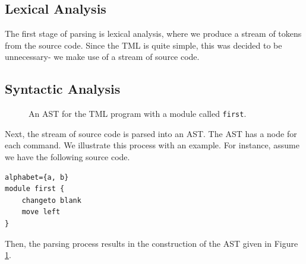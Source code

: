 \subsection{Lexical Analysis}
The first stage of parsing is lexical analysis, where we produce a stream of tokens from the source code. Since the TML is quite simple, this was decided to be unnecessary- we make use of a stream of source code.

\subsection{Syntactic Analysis}

\begin{figure}[htb]
    \centering
    \caption{An AST for the TML program with a module called \texttt{first}.}
    \label{fig:TML_AST}
\end{figure}

Next, the stream of source code is parsed into an AST. The AST has a node for each command. 
We illustrate this process with an example. For instance, assume we have the following source code.
\begin{lstlisting}[language=TML]
alphabet={a, b}
module first {
    changeto blank
    move left
}
\end{lstlisting}
Then, the parsing process results in the construction of the AST given in Figure \ref{fig:TML_AST}. 

